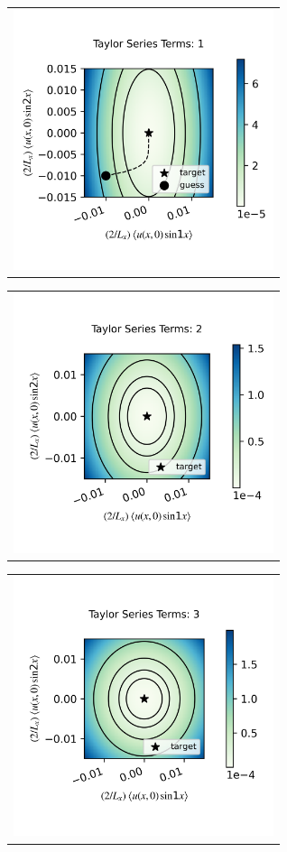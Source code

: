 \documentclass[longbibliography,amsmath,amssymb,aps,nofootinbib]{revtex4-2}
\begin{document}
\begin{figure}[h]
  \centering
  \begin{tabular}{@{}c@{}}
      \includegraphics[width=3in]{SPHRtest_Nts1a0p3b0p0c0p0T1p0R0p015kt10p0kt20.png}
  \end{tabular}
  \begin{tabular}{@{}c@{}}
      \includegraphics[width=3in]{SPHRtest_Nts2a0p3b0p0c0p0T1p0R0p015kt10p0kt20.png}
  \end{tabular}
  \begin{tabular}{@{}c@{}}
      \includegraphics[width=3in]{SPHRtest_Nts3a0p3b0p0c0p0T1p0R0p015kt10p0kt20.png}

\end{tabular}
\end{figure}
\end{document}
